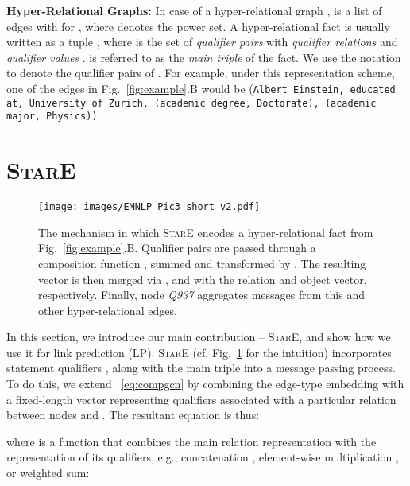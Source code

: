 \documentclass[11pt,a4paper]{article}
\begin{document}
\textbf{Hyper-Relational Graphs:} In case of a hyper-relational graph ,  is a list  of edges with  for , where  denotes the power set. A hyper-relational fact  is usually written as a tuple , where  is the set of \emph{qualifier pairs}  with \emph{qualifier relations}  and \emph{qualifier values} .  is referred to as the \emph{main triple} of the fact. We use the notation  to denote the qualifier pairs  of .
For example, under this representation scheme, one of the edges in Fig.~\ref{fig:example}.B would be (\texttt{Albert Einstein, educated at,  University of Zurich, (academic degree, Doctorate), (academic major, Physics))
}

















\section{\textsc{StarE}}
\label{sec:stare}

\begin{figure}[t]
    \centering
    \texttt{[image: images/EMNLP\_Pic3\_short\_v2.pdf]}
  \caption{The mechanism in which \textsc{StarE} encodes a hyper-relational fact from Fig.~\ref{fig:example}.B. Qualifier pairs are passed through a composition function , summed and transformed by . The resulting vector is then merged via , and  with the relation and object vector, respectively. Finally, node \emph{Q937} aggregates messages from this and other hyper-relational edges.} 
  \label{fig:stare}
\end{figure}

In this section, we introduce our main contribution -- \textsc{StarE},
and show how we use it for link prediction (LP).
\textsc{StarE} (cf. Fig.~\ref{fig:stare} for the intuition) incorporates statement qualifiers , along with the main triple  into a message passing process.
To do this, we extend ~\autoref{eq:compgcn} by combining the edge-type embedding  with a fixed-length vector  representing qualifiers associated with a particular relation  between nodes  and . The resultant equation is thus: 




where  is a function that combines the main relation representation with the representation of its qualifiers,
e.g., concatenation , element-wise multiplication , or weighted sum:
\end{document}
